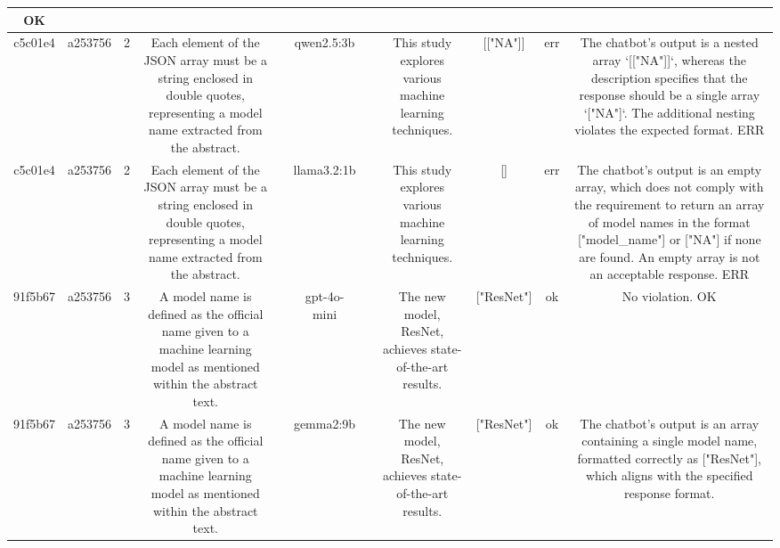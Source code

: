 \begin{table}[h!]
\begin{tabular}{|c|c|c|c|c|c|c|c|c|c|c|}
OK\\
\hline
c5c01e4 & a253756 & 2 & Each element of the JSON array must be a string enclosed in double quotes, representing a model name extracted from the abstract. &  & qwen2.5:3b &  & This study explores various machine learning techniques. & [["NA"]] & err & The chatbot's output is a nested array `[["NA"]]`, whereas the description specifies that the response should be a single array `["NA"]`. The additional nesting violates the expected format.
ERR\\
\hline
c5c01e4 & a253756 & 2 & Each element of the JSON array must be a string enclosed in double quotes, representing a model name extracted from the abstract. &  & llama3.2:1b &  & This study explores various machine learning techniques. & [] & err & The chatbot's output is an empty array, which does not comply with the requirement to return an array of model names in the format ["model_name"] or ["NA"] if none are found. An empty array is not an acceptable response.
ERR\\
\hline
91f5b67 & a253756 & 3 & A model name is defined as the official name given to a machine learning model as mentioned within the abstract text. &  & gpt-4o-mini &  & The new model, ResNet, achieves state-of-the-art results. & ["ResNet"] & ok & No violation.
OK\\
\hline
91f5b67 & a253756 & 3 & A model name is defined as the official name given to a machine learning model as mentioned within the abstract text. &  & gemma2:9b &  & The new model, ResNet, achieves state-of-the-art results. & ["ResNet"] 
 & ok & The chatbot's output is an array containing a single model name, formatted correctly as ["ResNet"], which aligns with the specified response format.


\end{tabular}
\end{table}
